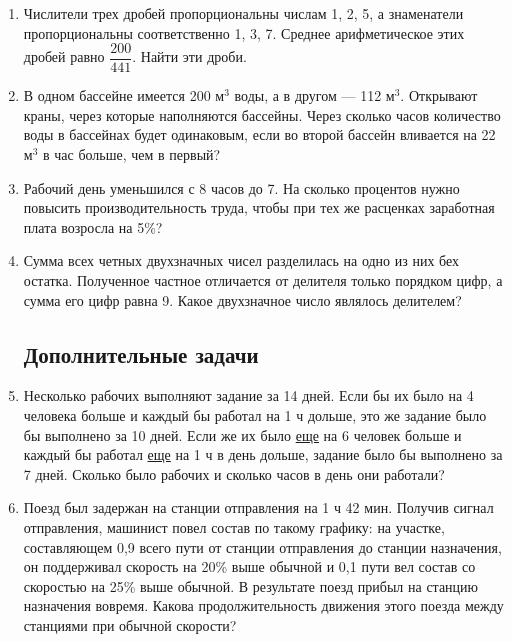 \documentclass[12pt, a4paper]{article}
\begin{document}
\begin{enumerate}
			\item Числители трех дробей пропорциональны числам 1, 2, 5, а знаменатели пропорциональны соответственно 1, 3, 7. Среднее арифметическое этих дробей равно $\dfrac{200}{441}$. Найти эти дроби.
			\item В одном бассейне имеется 200 м$^3$ воды, а в другом — 112 м$^3$. Открывают краны, через которые наполняются бассейны. Через сколько часов количество воды в бассейнах будет одинаковым, если во второй бассейн вливается на 22 м$^3$ в час больше, чем в первый?
			\item Рабочий день уменьшился с 8 часов до 7. На сколько процентов нужно повысить производительность труда, чтобы при тех же расценках заработная плата возросла на 5\%?
			\item Сумма всех четных двухзначных чисел разделилась на одно из них бех остатка. Полученное частное отличается от делителя только порядком цифр, а сумма его цифр равна 9. Какое двухзначное число являлось делителем?
			\subsection*{Дополнительные задачи}
			\item Несколько рабочих выполняют задание за 14 дней. Если бы их было на 4 человека больше и каждый бы работал на 1 ч дольше, это же задание было бы выполнено за 10 дней. Если же их было \underline{еще} на 6 человек больше и каждый бы работал \underline{еще} на 1 ч в день дольше, задание было бы выполнено за 7 дней. Сколько было рабочих и сколько часов в день они работали?
			\item Поезд был задержан на станции отправления на 1 ч 42 мин. Получив сигнал отправления, машинист повел состав по такому графику: на участке, составляющем 0,9 всего пути от станции отправления до станции назначения, он поддерживал скорость на 20\% выше обычной и 0,1 пути вел состав со скоростью на 25\% выше обычной. В результате поезд прибыл на станцию назначения вовремя. Какова продолжительность движения этого поезда между станциями при обычной скорости?
		\end{enumerate}
\end{document}
